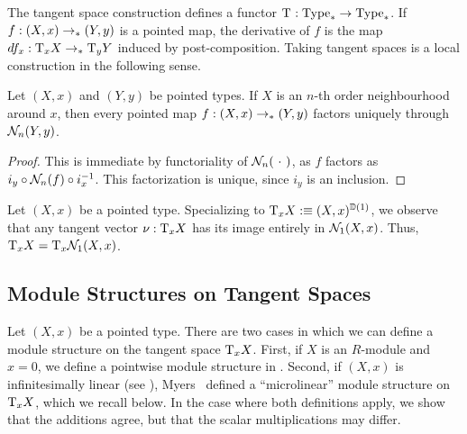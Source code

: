 The tangent space construction defines a functor $\tangent{}{} : \pType \rightarrow \pType$.
If $f : (X,x) \pto (Y,y)$ is a pointed map, the derivative of $f$ is the map $\der{f}{x} : \tangent{X}{x} \pto \tangent{Y}{y}$ induced by post-composition.
Taking tangent spaces is a local construction in the following sense.

\begin{lemma}\label{prp:hood-factorization}
  Let $(X,x)$ and $(Y,y)$ be pointed types.
  If $X$ is an $n$-th order neighbourhood around $x$, then every pointed map $f : (X,x) \pto (Y,y)$ factors uniquely through $\hood{Y,y}{n}$.
\end{lemma}

\begin{proof}
  This is immediate by functoriality of $\hood{\argmhole}{n}$, as $f$ factors as $i_y \circ \hood{f}{n} \circ i_x^{-1}$.
  This factorization is unique, since $i_y$ is an inclusion.
\end{proof}

\begin{remark}\label{rem:tangent-factorization}
  Let $(X,x)$ be a pointed type.
  Specializing  to $\tangent{X}{x} \defeq (X,x)^{\D(1)}$, we observe that any tangent vector $\nu : \tangent{X}{x}$ has its image entirely in $\hood{X,x}{1}$.
  Thus, $\tangent{X}{x} = \tangent{\hood{X,x}{1}}{x}$.
\end{remark}


\subsection{Module Structures on Tangent Spaces}

Let $(X,x)$ be a pointed type.
There are two cases in which we can define a module structure on the tangent space $\tangent{X}{x}$.
First, if $X$ is an $R$-module and $x = 0$, we define a pointwise module structure in .
Second, if $(X,x)$ is infinitesimally linear (see ), Myers~\cite{david-orbifolds} defined a ``microlinear'' module structure on $\tangent{X}{x}$, which we recall below.
In the case where both definitions apply, we show that the additions agree, but that the scalar multiplications may differ.

